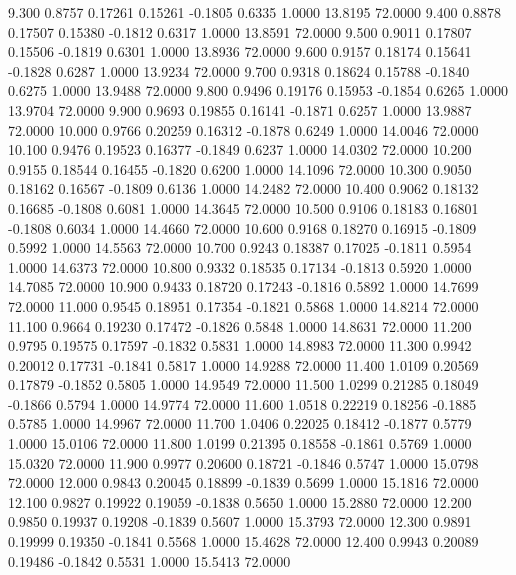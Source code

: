    9.300   0.8757   0.17261   0.15261  -0.1805   0.6335   1.0000  13.8195  72.0000
   9.400   0.8878   0.17507   0.15380  -0.1812   0.6317   1.0000  13.8591  72.0000
   9.500   0.9011   0.17807   0.15506  -0.1819   0.6301   1.0000  13.8936  72.0000
   9.600   0.9157   0.18174   0.15641  -0.1828   0.6287   1.0000  13.9234  72.0000
   9.700   0.9318   0.18624   0.15788  -0.1840   0.6275   1.0000  13.9488  72.0000
   9.800   0.9496   0.19176   0.15953  -0.1854   0.6265   1.0000  13.9704  72.0000
   9.900   0.9693   0.19855   0.16141  -0.1871   0.6257   1.0000  13.9887  72.0000
  10.000   0.9766   0.20259   0.16312  -0.1878   0.6249   1.0000  14.0046  72.0000
  10.100   0.9476   0.19523   0.16377  -0.1849   0.6237   1.0000  14.0302  72.0000
  10.200   0.9155   0.18544   0.16455  -0.1820   0.6200   1.0000  14.1096  72.0000
  10.300   0.9050   0.18162   0.16567  -0.1809   0.6136   1.0000  14.2482  72.0000
  10.400   0.9062   0.18132   0.16685  -0.1808   0.6081   1.0000  14.3645  72.0000
  10.500   0.9106   0.18183   0.16801  -0.1808   0.6034   1.0000  14.4660  72.0000
  10.600   0.9168   0.18270   0.16915  -0.1809   0.5992   1.0000  14.5563  72.0000
  10.700   0.9243   0.18387   0.17025  -0.1811   0.5954   1.0000  14.6373  72.0000
  10.800   0.9332   0.18535   0.17134  -0.1813   0.5920   1.0000  14.7085  72.0000
  10.900   0.9433   0.18720   0.17243  -0.1816   0.5892   1.0000  14.7699  72.0000
  11.000   0.9545   0.18951   0.17354  -0.1821   0.5868   1.0000  14.8214  72.0000
  11.100   0.9664   0.19230   0.17472  -0.1826   0.5848   1.0000  14.8631  72.0000
  11.200   0.9795   0.19575   0.17597  -0.1832   0.5831   1.0000  14.8983  72.0000
  11.300   0.9942   0.20012   0.17731  -0.1841   0.5817   1.0000  14.9288  72.0000
  11.400   1.0109   0.20569   0.17879  -0.1852   0.5805   1.0000  14.9549  72.0000
  11.500   1.0299   0.21285   0.18049  -0.1866   0.5794   1.0000  14.9774  72.0000
  11.600   1.0518   0.22219   0.18256  -0.1885   0.5785   1.0000  14.9967  72.0000
  11.700   1.0406   0.22025   0.18412  -0.1877   0.5779   1.0000  15.0106  72.0000
  11.800   1.0199   0.21395   0.18558  -0.1861   0.5769   1.0000  15.0320  72.0000
  11.900   0.9977   0.20600   0.18721  -0.1846   0.5747   1.0000  15.0798  72.0000
  12.000   0.9843   0.20045   0.18899  -0.1839   0.5699   1.0000  15.1816  72.0000
  12.100   0.9827   0.19922   0.19059  -0.1838   0.5650   1.0000  15.2880  72.0000
  12.200   0.9850   0.19937   0.19208  -0.1839   0.5607   1.0000  15.3793  72.0000
  12.300   0.9891   0.19999   0.19350  -0.1841   0.5568   1.0000  15.4628  72.0000
  12.400   0.9943   0.20089   0.19486  -0.1842   0.5531   1.0000  15.5413  72.0000

